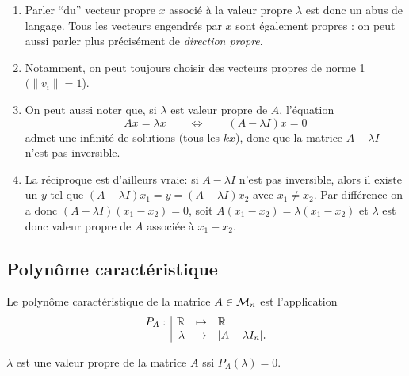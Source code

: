 \remarks
\begin{enumerate}
  \item Parler ``du'' vecteur propre $x$ associé à la valeur propre $\lambda$ est donc un abus de langage. Tous les vecteurs engendrés par $x$ sont également propres : on peut aussi parler plus précisément de {\em direction propre}. 
  \item Notamment, on peut toujours choisir des vecteurs propres de norme 1 $(\|v_i\| = 1$). 
  \item On peut aussi noter que, si $\lambda$ est valeur propre de $A$, l'équation
  \begin{equation} \label{eq:RqValeurPropre}
    Ax = \lambda x \qquad \Leftrightarrow \qquad (A - \lambda I)x = 0
  \end{equation}
  admet une infinité de solutions (tous les $kx$), donc que la matrice $A - \lambda I$ n'est pas inversible.
  \item La réciproque est d'ailleurs vraie: si $A - \lambda I$ n'est pas inversible, alors il existe un $y$ tel que $(A  - \lambda I)x_1 = y = (A - \lambda I)x_2$ avec $x_1 \neq x_2$. Par différence on a donc $(A  - \lambda I)(x_1 - x_2) = 0$, soit $A(x_1 - x_2) = \lambda(x_1 - x_2)$ et $\lambda$ est donc valeur propre de $A$ associée à $x_1 - x_2$.
\end{enumerate}

\subsection{Polynôme caractéristique} \label{sec:polCarac}

\begin{definition}
  Le polynôme caractéristique de la matrice $A \in \mathcal{M}_n$ est l'application 
  $$
  \begin{array}{r|rcl}
   P_A: & \mathbb{R} & \mapsto & \mathbb{R} \\
    & \lambda & \to & |A - \lambda I_n|.
  \end{array}
  $$
\end{definition}

\bigskip
\begin{theorem}
  $\lambda$ est une valeur propre de la matrice $A$ ssi $P_A(\lambda) = 0$.
\end{theorem}


